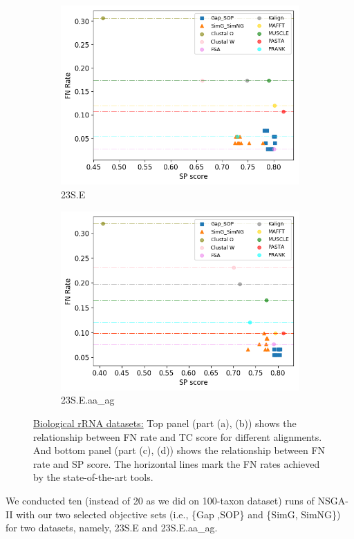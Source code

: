 \begin{figure}[!htbp]
\begin{adjustwidth}{-0.2cm}{}
\begin{subfigure}{0.5\columnwidth}
			\includegraphics[width=\columnwidth]{Figure/summary/precomputedInit/23S.E/fnrate_vs_sp}
			\caption{23S.E}
		\end{subfigure}	
		\begin{subfigure}{0.5\columnwidth}
			\includegraphics[width=\columnwidth]{Figure/summary/precomputedInit/23S.E.aa_ag/fnrate_vs_sp}
			\caption{23S.E.aa\_ag}
		\end{subfigure}
	\end{adjustwidth}
	\caption{\underline{Biological rRNA datasets:} Top panel (part (a), (b)) shows the relationship between FN rate and TC score for different alignments. And bottom panel (part (c), (d)) shows the relationship between FN rate and SP score. The horizontal lines mark the FN rates achieved by the state-of-the-art tools.}
	\label{fig:fnrate_vs_tc_bio}
\end{figure}
We conducted ten (instead of 20 as we did on 100-taxon dataset) runs of NSGA-II with our two selected objective sets (i.e., \{Gap ,SOP\} and \{SimG, SimNG\}) for two datasets, namely, 23S.E and 23S.E.aa\_ag. 

